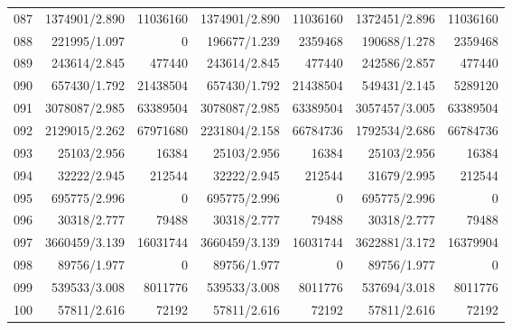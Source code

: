 \begin{longtable}{crrrrrr}
087 & 1374901/2.890 & 11036160 & 1374901/2.890 & 11036160 & 1372451/2.896 & 11036160 \\
088 & 221995/1.097 & 0 & 196677/1.239 & 2359468 & 190688/1.278 & 2359468 \\
089 & 243614/2.845 & 477440 & 243614/2.845 & 477440 & 242586/2.857 & 477440 \\
090 & 657430/1.792 & 21438504 & 657430/1.792 & 21438504 & 549431/2.145 & 5289120 \\
091 & 3078087/2.985 & 63389504 & 3078087/2.985 & 63389504 & 3057457/3.005 & 63389504 \\
092 & 2129015/2.262 & 67971680 & 2231804/2.158 & 66784736 & 1792534/2.686 & 66784736 \\
093 & 25103/2.956 & 16384 & 25103/2.956 & 16384 & 25103/2.956 & 16384 \\
094 & 32222/2.945 & 212544 & 32222/2.945 & 212544 & 31679/2.995 & 212544 \\
095 & 695775/2.996 & 0 & 695775/2.996 & 0 & 695775/2.996 & 0 \\
096 & 30318/2.777 & 79488 & 30318/2.777 & 79488 & 30318/2.777 & 79488 \\
097 & 3660459/3.139 & 16031744 & 3660459/3.139 & 16031744 & 3622881/3.172 & 16379904 \\
098 & 89756/1.977 & 0 & 89756/1.977 & 0 & 89756/1.977 & 0 \\
099 & 539533/3.008 & 8011776 & 539533/3.008 & 8011776 & 537694/3.018 & 8011776 \\
100 & 57811/2.616 & 72192 & 57811/2.616 & 72192 & 57811/2.616 & 72192 \\
\end{longtable}

